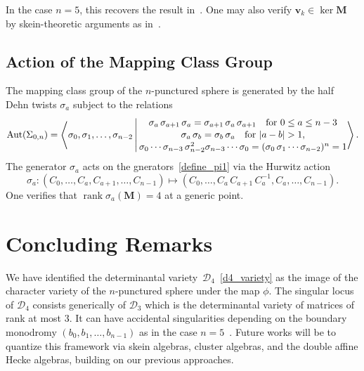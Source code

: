 \documentclass[12pt,reqno]{amsart}
\DeclareMathOperator{\rank}{rank}
\DeclareMathOperator{\Aut}{Aut}
\begin{document}
In the case  $n=5$, this recovers  the result in~\cite{KHikami26a}.
One may also verify
$\mathbf{v}_k\in \ker \mathbf{M}$ by
skein-theoretic arguments  as in~\cite{KHikami26a}.


\subsection{Action of the Mapping Class Group}

The mapping class group of the $n$-punctured sphere is generated by the
half Dehn twists $\sigma_a$ subject to the
relations~\cite{Birman74,FarbMarg11Book,MagnKarrSoli76Book}
\begin{equation}
  \label{eq:4}
  \Aut(\Sigma_{0,n})
  =
  \left\langle
    \sigma_0, \sigma_1, \dots, \sigma_{n-2}
    \,\middle|\,
    \begin{matrix}
      \sigma_a \, \sigma_{a+1} \, \sigma_a
      =
      \sigma_{a+1} \,  \sigma_a \, \sigma_{a+1}
      \quad \text{for $0\leq a\leq n-3$}
      \\[1pt]
      \sigma_a\, \sigma_b = \sigma_b \, \sigma_a
      \quad \text{for $ |a-b|>1$},
      \\[1pt]
      \sigma_0 \cdots \sigma_{n-3} \, \sigma_{n-2}^2
      \sigma_{n-3} \cdots \sigma_0
      =
      (\sigma_0 \, \sigma_1\cdots \sigma_{n-2})^{n}=1
    \end{matrix}
  \right\rangle .
\end{equation}
The generator $\sigma_a$ acts on the gnerators~\eqref{define_pi1} via 
the Hurwitz action
\begin{equation}
  \label{Hurwitz}
  \sigma_a:
  \left( C_0, \dots, C_a, C_{a+1}, \dots, C_{n-1} \right)
  \mapsto
  \left(
    C_0,  \dots, C_a \, C_{a+1}\,C_a^{-1} , C_a, \dots, C_{n-1}
  \right) .
\end{equation}
One verifies that
$\rank \sigma_a(\mathbf{M})=4$ at a generic point.



\section{Concluding Remarks}

We have identified  the determinantal variety~$\mathcal{D}_4$~\eqref{d4_variety}
as the image of
the character variety of the $n$-punctured sphere under the map
$\phi$.
The singular locus of $\mathcal{D}_4$ consists generically of
$\mathcal{D}_3$
which is the determinantal variety of matrices of rank at most $3$.
It can  have accidental singularities  depending  on the boundary
monodromy $(b_0, b_1, \dots, b_{n-1})$ as in the case
$n=5$~\cite{KHikami26a}.
Future works will
be
to quantize this framework
via  skein algebras, cluster algebras, and the double
affine Hecke algebras, building on our  previous approaches.
\end{document}
